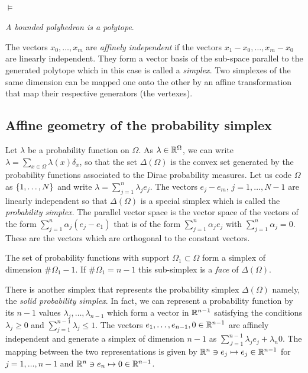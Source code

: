 \documentclass[12pt,a4paper]{amsart}
\theoremstyle{plain}%
\theoremstyle{definition}
\theoremstyle{remark}
\begin{document}
\paragraph{$\models$}
\emph{A bounded polyhedron is a polytope}. 

The vectors $x_0,\dots,x_m$ are \emph{affinely independent} if the vectors $x_1-x_0,\dots,x_m-x_0$ are linearly independent. They form a vector basis of the sub-space parallel to the generated polytope which in this case is called a \emph{simplex}. Two simplexes of the same dimension can be mapped one onto the other by an affine transformation that map their respective generators (the vertexes).    


\subsection{Affine geometry of the probability simplex}
\label{sec:probability-simplex}

Let $\lambda$ be a probability function on $\Omega$. As $\lambda \in \mathbb{R}^\Omega$, we can write $\lambda = \sum_{x \in \Omega} \lambda(x) \delta_x$, so that the set $\Delta(\Omega)$ is the convex set generated by the probability functions associated to the Dirac probability measures. Let us code $\Omega$ as $\left\{1,\dots,N\right\}$ and write $\lambda= \sum_{j=1}^n \lambda_j e_j$. The vectors $e_j - e_m$, $j=1,\dots,N-1$ are linearly independent so that $\Delta(\Omega)$ is a special simplex which is called the \emph{probability simplex}. The parallel vector space is the vector space of the vectors of the form $\sum_{j=1}^n \alpha_j (e_j-e_1)$ that is of the form $\sum_{j=1}^n \alpha_j e_j$ with $\sum_{j=1}^n \alpha_j =0$. These are the vectors which are orthogonal to the constant vectors.

The set of probability functions with support $\Omega_1 \subset \Omega$ form a simplex of dimension $\# \Omega_1 -1$. If $\#\Omega_1 = n-1$ this sub-simplex is a \emph{face} of $\Delta(\Omega)$.

There is another simplex that represents the probability simplex $\Delta(\Omega)$ namely, the \emph{solid probability simplex}. In fact, we can represent a probability function by its $n-1$ values $\lambda_j,\dots,\lambda_{n-1}$ which form a vector in $\mathbb{R}^{n-1}$ satisfying the conditions $\lambda_j \geq 0$ and $\sum_{j=1}^{n-1} \lambda_j \leq 1$. The vectors $e_1,\dots,e_{n-1},0 \in \mathbb{R}^{n-1}$ are affinely independent and generate a simplex of dimension $n-1$ as $\sum_{J=1}^{n-1} \lambda_j e_j + \lambda_n 0$. The mapping between the two representations is given by $\mathbb{R}^n \ni e_j \mapsto e_j \in \mathbb{R}^{n-1}$ for $j=1,\dots,n-1$ and $\mathbb{R}^n \ni e_n \mapsto 0 \in \mathbb{R}^{n-1}$.
\end{document}
